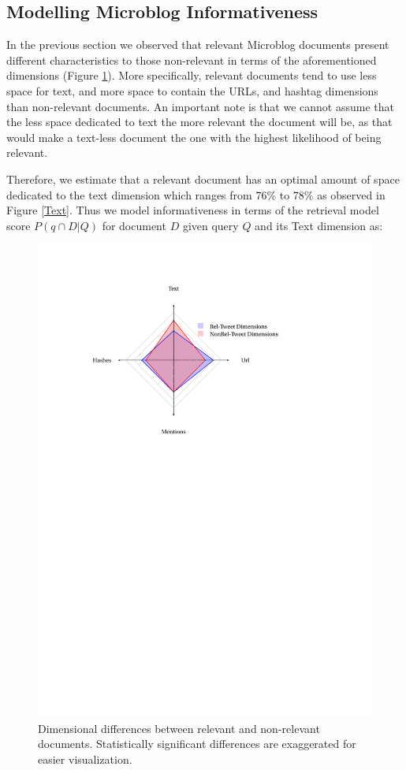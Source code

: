 \subsection{Modelling Microblog Informativeness}
In the previous section we observed that relevant Microblog documents present different characteristics to those non-relevant in terms of the aforementioned dimensions (Figure \ref{dimensionaltweet}). More specifically, relevant documents tend to use less space for text, and more space to contain the URLs, and hashtag dimensions than non-relevant documents. An important note is that we cannot assume that the less space dedicated to text the more relevant the document will be, as that would make a text-less document the one with the highest likelihood of being relevant. 

Therefore, we estimate that a relevant document has an optimal amount of space dedicated to the text dimension which ranges from 76\% to 78\% as observed in Figure \ref{Text}. Thus we model informativeness in terms of the retrieval model score \(P(q \cap D|Q)\) for document \(D\) given query \(Q\) and its Text dimension as: 

\begin{figure}[]
	\centering
	\includegraphics[trim = 30mm 175mm 58mm 22mm, clip, width=11.5cm]{kiviat.pdf}
	\caption{Dimensional differences between relevant and non-relevant documents. Statistically significant differences are exaggerated for easier visualization.}
	\label{dimensionaltweet}
\end{figure}

